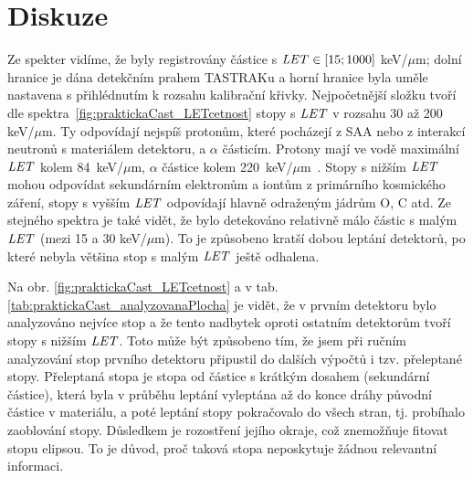 \section{Diskuze}
Ze spekter vidíme, že byly registrovány částice s $\mathit{LET}\in[15;1000]$ keV/$\mu$m; dolní hranice je dána detekčním prahem TASTRAKu a horní hranice byla uměle nastavena s přihlédnutím k rozsahu kalibrační křivky. Nejpočetnější složku tvoří dle spektra~\ref{fig:praktickaCast_LETcetnost} stopy s $\mathit{LET}$ v rozsahu 30 až 200 keV/$\mu$m. Ty odpovídají nejspíš protonům, které pocházejí z SAA nebo z interakcí neutronů s materiálem detektoru, a $\alpha$ částicím. Protony mají ve vodě maximální $\mathit{LET}$ kolem 84~keV/$\mu$m, $\alpha$ částice kolem 220~keV/$\mu$m~\cite{SRIM}. Stopy s nižším $\mathit{LET}$ mohou odpovídat sekundárním elektronům a iontům z primárního kosmického záření, stopy s vyšším $\mathit{LET}$ odpovídají hlavně odraženým jádrům O, C atd. Ze stejného spektra je
také vidět, že bylo detekováno relativně málo částic s malým $\mathit{LET}$ (mezi 15 a 30 keV/$\mu$m). To je způsobeno kratší dobou leptání detektorů, po které nebyla většina stop s malým $\mathit{LET}$ ještě odhalena. 

Na obr. \ref{fig:praktickaCast_LETcetnost} a v tab. \ref{tab:praktickaCast_analyzovanaPlocha} je vidět, že v prvním detektoru bylo analyzováno nejvíce stop a že tento nadbytek oproti ostatním detektorům tvoří stopy s nižším $\mathit{LET}$. Toto může být způsobeno tím, že jsem při ručním analyzování stop prvního detektoru připustil do dalších výpočtů i tzv. přeleptané stopy. Přeleptaná stopa je stopa od částice s krátkým dosahem (sekundární částice), která byla v průběhu leptání vyleptána až do konce dráhy původní částice v materiálu, a poté leptání stopy pokračovalo do všech stran, tj. probíhalo zaoblování stopy. Důsledkem je rozostření jejího okraje, což znemožňuje fitovat stopu elipsou. To je důvod, proč taková stopa neposkytuje žádnou relevantní informaci.

